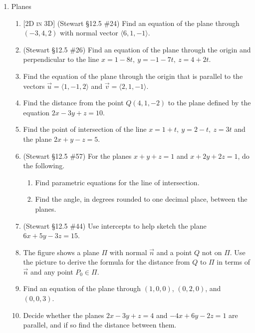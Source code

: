 \documentclass[12pt]{article}
\newcommand{\dimtag}[1]{{\footnotesize\textsc{[#1]}}\;}
\begin{document}
\begin{enumerate}
\item Planes
    \begin{enumerate}
        \item \dimtag{2D in 3D} (Stewart \S12.5 \#24) Find an equation of the plane through $(-3,4,2)$ with normal vector $\langle 6,1,-1\rangle$.
        \item (Stewart \S12.5 \#26) Find an equation of the plane through the origin and perpendicular to the line $x = 1 - 8t,\ y = -1 - 7t,\ z = 4 + 2t$.
        \item Find the equation of the plane through the origin that is parallel to the vectors $\vec{u} = \langle 1, -1, 2 \rangle$ and $\vec{v} = \langle 2, 1, -1 \rangle$.
        \item Find the distance from the point $Q(4, 1, -2)$ to the plane defined by the equation $2x - 3y + z = 10$.
        \item Find the point of intersection of the line $x=1+t,\ y=2-t,\ z=3t$ and the plane $2x+y-z=5$.
        \item (Stewart \S12.5 \#57) For the planes $x+y+z=1$ and $x+2y+2z=1$, do the following.
        \begin{enumerate}
            \item Find parametric equations for the line of intersection.
            \item Find the angle, in degrees rounded to one decimal place, between the planes.
        \end{enumerate}
        \item (Stewart \S12.5 \#44) Use intercepts to help sketch the plane $6x + 5y - 3z = 15$.
        \item The figure shows a plane $\Pi$ with normal $\vec{n}$ and a point $Q$ not on $\Pi$. Use the picture to derive the formula for the distance from $Q$ to $\Pi$ in terms of $\vec{n}$ and any point $P_0\in\Pi$.
        \begin{center}
        \end{center}
        \item Find an equation of the plane through $(1,0,0)$, $(0,2,0)$, and $(0,0,3)$.
        \item Decide whether the planes $2x-3y+z=4$ and $-4x+6y-2z=1$ are parallel, and if so find the distance between them.
    \end{enumerate}
\newpage


\end{enumerate}
\end{document}
